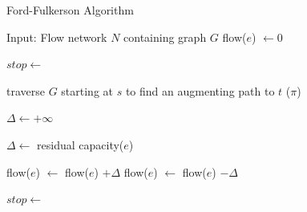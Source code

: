 \begin{algorithm}[h]
\caption{Ford-Fulkerson Algorithm}
\label{alg:FordFulkerson}
\begin{algorithmic}
\REQUIRE Input: Flow network $N$ containing graph $G$
 \STATE flow($e$) $\gets 0$
\ENDFOR

\STATE $stop \gets$ \FALSE

\REPEAT
\STATE traverse $G$ starting at $s$ to find an augmenting path to $t$ ($\pi$)


\STATE $\Delta \gets +\infty$

\STATE $\Delta \gets $ residual capacity($e$)
\ENDIF
\ENDFOR


\STATE flow($e$) $\gets $ flow($e$) $+ \Delta$
\ELSE
\STATE flow($e$) $\gets $ flow($e$) $- \Delta$
\ENDIF

\ENDFOR

\ELSE
\STATE $stop \gets$ \TRUE
\ENDIF
{}

\end{algorithmic}
\end{algorithm}